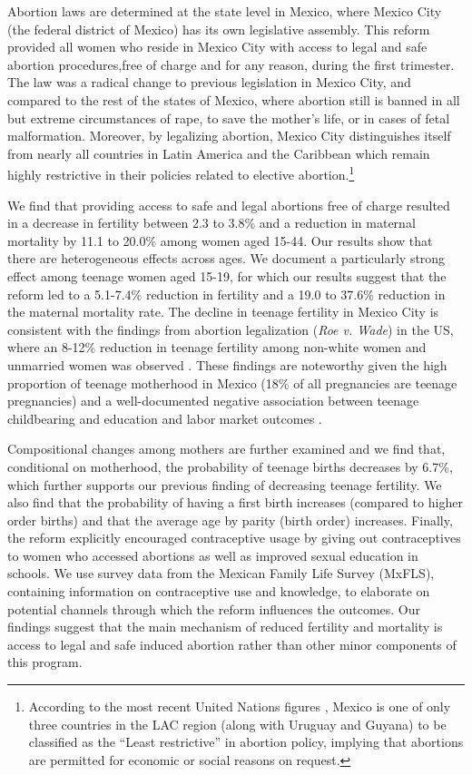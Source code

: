 \documentclass[a4paper, 11pt]{article}
\begin{document}
\begin{spacing}{2}
Abortion laws are determined at the state level in Mexico, where Mexico City (the federal district of Mexico) has its own legislative assembly. This reform provided all women who reside in Mexico City with access to legal and safe abortion procedures,free of charge and for any reason, during the first trimester. The law was a radical change to previous legislation in Mexico City, and compared to the rest of the states of Mexico, where abortion still is banned in all but extreme circumstances of rape, to save the mother's life, or in cases of fetal malformation. Moreover, by legalizing abortion, Mexico City distinguishes itself from nearly all countries in Latin America and the Caribbean which remain highly restrictive in their policies related to elective abortion.\footnote{According to the most recent United Nations figures \citep{UN2014}, Mexico is one of only three countries in the LAC region (along with Uruguay and Guyana) to be classified as the ``Least restrictive'' in abortion policy, implying that abortions are permitted for economic or social reasons on request.}
  

We find that providing access to safe and legal abortions free of charge resulted in a decrease in fertility between 2.3 to 3.8\% and a reduction in maternal mortality by 11.1 to 20.0\% among women aged 15-44. Our results show that there are heterogeneous effects across ages. We document a particularly strong effect among teenage women aged 15-19, for which our results suggest that the reform led to a 5.1-7.4\% reduction in fertility and a 19.0 to 37.6\% reduction in the maternal mortality rate. The decline in teenage fertility in Mexico City is consistent with the findings from abortion legalization (\textit{Roe v. Wade}) in the US, where an 8-12\% reduction in teenage fertility among non-white women and unmarried women was observed \citep{AngristEvans}. These findings are noteworthy given the high proportion of teenage motherhood in Mexico (18\% of all pregnancies are teenage pregnancies) and a well-documented negative association between teenage childbearing and education and labor market outcomes \citep{furstenberg1976unplanned}. 


Compositional changes among mothers are further examined and we find that, conditional on motherhood, the probability of teenage births decreases by 6.7\%, which further supports our previous finding of decreasing teenage fertility. We also find that the probability of having a first birth increases (compared to higher order births) and that the average age by parity (birth order) increases. Finally, the reform explicitly encouraged contraceptive usage by giving out contraceptives to women who accessed abortions as well as improved sexual education in schools. We use survey data from the Mexican Family Life Survey (MxFLS), containing information on contraceptive use and knowledge, to elaborate on potential channels through which the reform influences the outcomes. Our findings suggest that the main mechanism of reduced fertility and mortality is access to legal and safe induced abortion rather than other minor components of this program.   


\end{spacing}
\end{document}
